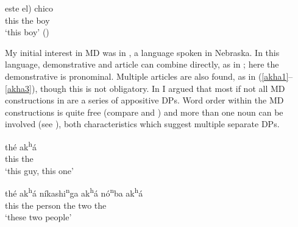 \documentclass[output=paper]{langscibook}
\begin{document}
\ex
\gll este \minsp{(*} el) chico \\
    this {} the boy \\     %
\glt `this  boy' \hfill ()
\z
\z

 \noindent My initial interest in MD was in , a  language spoken in Nebraska. In this language, demonstrative and article can combine directly, as in ; here the demonstrative is pronominal. Multiple articles are also found, as in (\ref{akha1}--\ref{akha3}), though this is not obligatory. In \citet{Rudin1993} I argued that most if not all MD constructions in  are a series of appositive DPs. Word order within the MD constructions is quite free (compare  and ) and more than one noun can be involved (see ), both characteristics which suggest multiple separate DPs.







\ea \label{ex:Omaha}
\ea \label{thisguy}
\gll thé ak\textsuperscript{h}á \\
     this the\\
     \glt `this  guy, this one' %

\ex \label{akha1}
\gll thé ak\textsuperscript{h}á níkashi\textsuperscript{n}ga ak\textsuperscript{h}á nó\textsuperscript{n}ba ak\textsuperscript{h}á\\
    this the person the two the \\
\glt `these two people'
\end{document}
